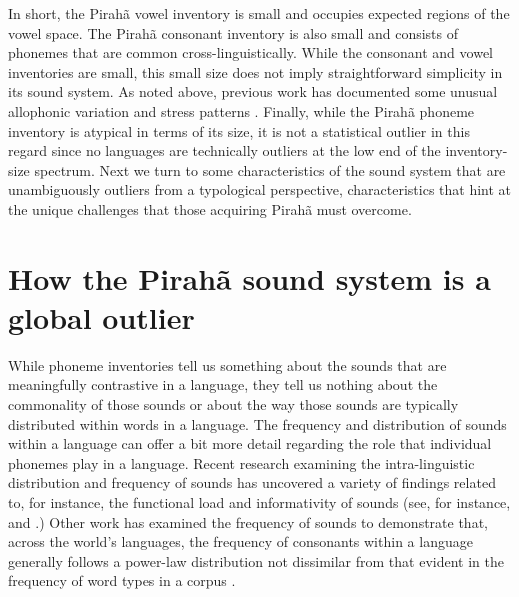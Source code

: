 \documentclass[output=paper,colorlinks,citecolor=brown
]{langscibook}
\begin{document}
    In short, the Pirahã vowel inventory is small and occupies expected regions of the vowel space. The Pirahã consonant inventory is also small and consists of phonemes that are common cross-linguistically. While the consonant and vowel inventories are small, this small size does not imply straightforward simplicity in its sound system. As noted above, previous work has documented some unusual allophonic variation and stress patterns \citep{everett1984relevance, everett1986piraha}. Finally, while the Pirahã phoneme inventory is atypical in terms of its size, it is not a statistical outlier in this regard since no languages are technically outliers at the low end of the inventory-size spectrum. Next we turn to some characteristics of the sound system that are unambiguously outliers from a typological perspective, characteristics that hint at the unique challenges that those acquiring Pirahã must overcome.

\section{How the Pirahã sound system is a global outlier}\label{sec:everett:3}\largerpage

    While phoneme inventories tell us something about the sounds that are meaningfully contrastive in a language, they tell us nothing about the commonality of those sounds or about the way those sounds are typically distributed within words in a language. The frequency and distribution of sounds within a language can offer a bit more detail regarding the role that individual phonemes play in a language. Recent research examining the intra-linguistic distribution and frequency of sounds has uncovered a variety of findings related to, for instance, the functional load and informativity of sounds (see, for instance, \citealt{wedel2013functional} and \citealt{priva2017informativity}.) Other work has examined the frequency of sounds to demonstrate that, across the world’s languages, the frequency of consonants within a language generally follows a power-law distribution not dissimilar from that evident in the frequency of word types in a corpus \citep{everett2018similar}.
    
\end{document}
